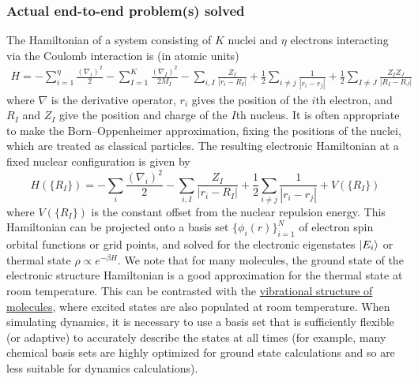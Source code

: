 \begin{refsection}
\subsubsection*{Actual end-to-end problem(s) solved}
The Hamiltonian of a system consisting of $K$ nuclei and $\eta$ electrons interacting via the Coulomb interaction is (in atomic units) 
\begin{equation}
\begin{aligned}
	H = -\sum_{i=1}^\eta \frac{(\nabla_{i})^2}{2}  - \sum_{I=1}^K \frac{(\nabla_{I})^2}{2M_I} - \sum_{i,I}\frac{Z_I}{|r_{i}-R_{I}|} +\frac{1}{2}\sum_{i\neq j}\frac{1}{|r_{i}-r_{j}|} + \frac{1}{2}\sum_{I\neq J}\frac{Z_IZ_J}{|R_{I}-R_{J}|}
\end{aligned}
\end{equation}
where $\nabla$ is the derivative operator, $r_{i}$ gives the position of the $i$th electron, and $R_{I}$ and $Z_I$ give the position and charge of the $I$th nucleus. It is often appropriate to make the Born--Oppenheimer approximation, fixing the positions of the nuclei, which are treated as classical particles. The resulting electronic Hamiltonian at a fixed nuclear configuration is given by
\begin{equation}\label{Eq:BornOppElectronic}
	H(\{R_{I}\}) = -\sum_i\frac{(\nabla_{i})^2}{2} - \sum_{i,I}\frac{Z_I}{|r_{i}-R_{I}|} + \frac{1}{2}\sum_{i\neq j}\frac{1}{|r_{i}-r_{j}|} + V(\{R_{I}\})
\end{equation}
where $V(\{R_{I}\})$ is the constant offset from the nuclear repulsion energy. This Hamiltonian can be projected onto a basis set $\{\phi_i(r)\}_{i=1}^N$ of electron spin orbital functions or grid points, and solved for the electronic eigenstates $\lvert E_i\rangle$ or thermal state $\rho \propto e^{-\beta H}$. We note that for many molecules, the ground state of the electronic structure Hamiltonian is a good approximation for the thermal state at room temperature. This can be contrasted with the \hyperref[appl:VibrationalStructure]{vibrational structure of molecules}, where excited states are also populated at room temperature.
When simulating dynamics, it is necessary to use a basis set that is sufficiently flexible (or adaptive) to accurately describe the states at all times (for example, many chemical basis sets are highly optimized for ground state calculations and so are less suitable for dynamics calculations). 


\end{refsection}
